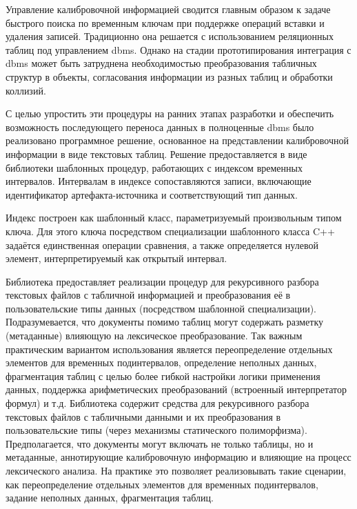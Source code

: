 Управление калибровочной информацией сводится главным образом к
задаче быстрого поиска по временным ключам при поддержке операций
вставки и удаления записей. Традиционно она решается с
использованием реляционных таблиц под управлением \acrshort{dbms}.
Однако на стадии прототипирования интеграция с \acrshort{dbms}
может быть затруднена необходимостью преобразования табличных структур в объекты,
согласования информации из разных таблиц и обработки коллизий.

С целью упростить эти процедуры на ранних этапах разработки и
обеспечить возможность последующего переноса данных в полноценные
\acrshort{dbms} было реализовано программное решение, основанное на
представлении калибровочной информации в виде текстовых таблиц.
Решение предоставляется в виде библиотеки шаблонных
процедур, работающих с индексом временных интервалов. Интервалам
в индексе сопоставляются записи, включающие идентификатор
артефакта-источника и соответствующий тип данных.

Индекс построен как шаблонный класс, параметризуемый произвольным
типом ключа. Для этого ключа посредством специализации шаблонного
класса C++ задаётся единственная операции сравнения, а также определяется
нулевой элемент, интерпретируемый как открытый интервал.

Библиотека предоставляет реализации процедур для рекурсивного
разбора текстовых файлов с табличной информацией и преобразования
её в пользовательские типы данных (посредством шаблонной
специализации). Подразумевается, что документы помимо таблиц могут
содержать разметку (метаданные) влияющую на
лексическое преобразование. Так важным практическим вариантом
использования  является переопределение отдельных элементов для
временных подинтервалов, определение неполных данных, фрагментация
таблиц с целью более гибкой настройки логики применения данных,
поддержка арифметических преобразований (встроенный интерпретатор
формул) и т.д.
Библиотека содержит средства для рекурсивного разбора текстовых файлов
с табличными данными и их преобразования в пользовательские типы
(через механизмы статического полиморфизма). Предполагается,
что документы могут включать не только таблицы, но и метаданные,
аннотирующие калибровочную информацию и влияющие на процесс
лексического анализа. На практике это позволяет реализовывать
такие сценарии, как переопределение отдельных элементов для
временных подинтервалов, задание неполных данных, фрагментация
таблиц.

